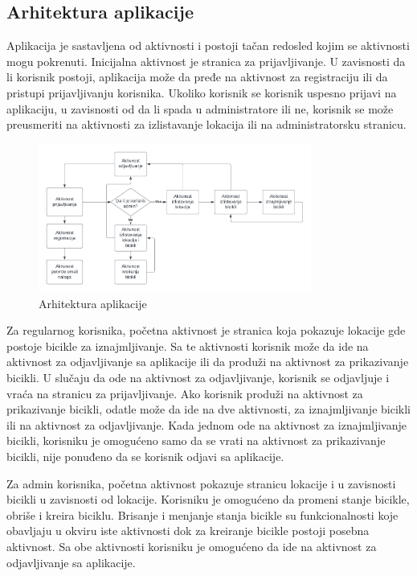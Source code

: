 \documentclass[12pt,oneside]{memoir}
\begin{document}
\subsection{Arhitektura aplikacije}
 
Aplikacija je sastavljena od aktivnosti i postoji tačan redosled kojim se aktivnosti mogu pokrenuti. Inicijalna aktivnost je stranica za prijavljivanje. U zavisnosti da li korisnik postoji, aplikacija može da pređe na aktivnost za registraciju ili da pristupi prijavljivanju korisnika. Ukoliko korisnik se korisnik uspesno prijavi na aplikaciju, u zavisnosti od da li spada u administratore ili ne, korisnik se može preusmeriti na aktivnosti za izlistavanje lokacija ili na administratorsku stranicu.
 
\begin{figure}[!ht]
  \centering
  \includegraphics[width=0.8\textwidth]{Organizacija aktivnosti.png}
  \caption{Arhitektura aplikacije}
  \label{fig:arhitekturaApplikacije}
\end{figure}
 
Za regularnog korisnika, početna aktivnost je stranica koja pokazuje lokacije gde postoje bicikle za iznajmljivanje. Sa te aktivnosti korisnik može da ide na aktivnost za odjavljivanje sa aplikacije ili da produži na aktivnost za prikazivanje bicikli. U slučaju da ode na aktivnost za odjavljivanje, korisnik se odjavljuje i vraća na stranicu za prijavljivanje. Ako korisnik produži na aktivnost za prikazivanje bicikli, odatle može da ide na dve aktivnosti, za iznajmljivanje bicikli ili na aktivnost za odjavljivanje. Kada jednom ode na aktivnost za iznajmljivanje bicikli, korisniku je omogućeno samo da se vrati na aktivnost za prikazivanje bicikli, nije ponuđeno da se korisnik odjavi sa aplikacije.
 
Za admin korisnika, početna aktivnost pokazuje stranicu lokacije i u zavisnosti bicikli u zavisnosti od lokacije. Korisniku je omogućeno da promeni stanje bicikle, obriše i kreira biciklu. Brisanje i menjanje stanja bicikle su funkcionalnosti koje obavljaju u okviru iste aktivnosti dok za kreiranje bicikle postoji posebna aktivnost. Sa obe aktivnosti korisniku je omogućeno da ide na aktivnost za odjavljivanje sa aplikacije.
 
\end{document}
